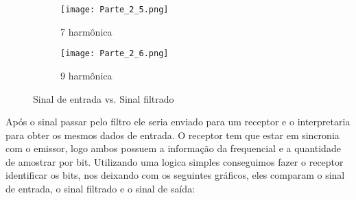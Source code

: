 \documentclass{article}
\begin{document}
        \begin{figure}[H]
            \begin{multicols}{2}
                \begin{figure}[H]
                    \begin{center}
                        \texttt{[image: Parte\_2\_5.png]}
                        \caption{7 harmônica}
                        \label{fig:Parte_2_5}
                    \end{center}
                \end{figure}
                \begin{figure}[H]
                    \begin{center}
                        \texttt{[image: Parte\_2\_6.png]}
                        \caption{9 harmônica}
                        \label{fig:Parte_2_6}
                    \end{center}
                \end{figure}
            \end{multicols}
            \caption{Sinal de entrada vs. Sinal filtrado}
            \label{fig:Parte_2}
        \end{figure}
        Após o sinal passar pelo filtro ele seria enviado para um receptor e o interpretaria para obter os mesmos dados de entrada. O receptor tem que estar em sincronia com o emissor, logo ambos possuem a informação da frequencial e a quantidade de amostrar por bit. Utilizando uma logica simples conseguimos fazer o receptor identificar os bits, nos deixando com os seguintes gráficos, eles comparam o sinal de entrada, o sinal filtrado e o sinal de saída:
        
\end{document}
